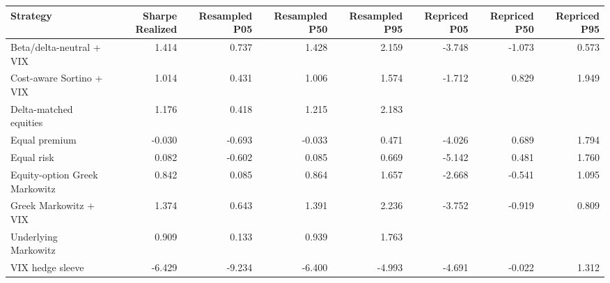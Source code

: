 \begin{tabular}{lrrrrrrr}
\toprule
Strategy & Sharpe Realized & Resampled P05 & Resampled P50 & Resampled P95 & Repriced P05 & Repriced P50 & Repriced P95 \\
\midrule
Beta/delta-neutral + VIX & 1.414 & 0.737 & 1.428 & 2.159 & -3.748 & -1.073 & 0.573 \\
Cost-aware Sortino + VIX & 1.014 & 0.431 & 1.006 & 1.574 & -1.712 & 0.829 & 1.949 \\
Delta-matched equities & 1.176 & 0.418 & 1.215 & 2.183 &  &  &  \\
Equal premium & -0.030 & -0.693 & -0.033 & 0.471 & -4.026 & 0.689 & 1.794 \\
Equal risk & 0.082 & -0.602 & 0.085 & 0.669 & -5.142 & 0.481 & 1.760 \\
Equity-option Greek Markowitz & 0.842 & 0.085 & 0.864 & 1.657 & -2.668 & -0.541 & 1.095 \\
Greek Markowitz + VIX & 1.374 & 0.643 & 1.391 & 2.236 & -3.752 & -0.919 & 0.809 \\
Underlying Markowitz & 0.909 & 0.133 & 0.939 & 1.763 &  &  &  \\
VIX hedge sleeve & -6.429 & -9.234 & -6.400 & -4.993 & -4.691 & -0.022 & 1.312 \\
\bottomrule
\end{tabular}
